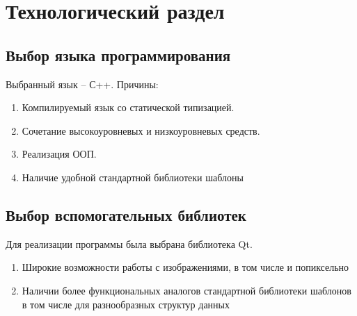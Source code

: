 \chapter{Технологический раздел}
\section{Выбор  языка программирования}
Выбранный язык – С++.
Причины:
\begin{enumerate}
	 \item Компилируемый язык со статической типизацией. 
	 \item Сочетание высокоуровневых и низкоуровневых средств.
	 \item Реализация ООП.
	 \item Наличие удобной стандартной библиотеки шаблоны
	 \end{enumerate}
\section{Выбор вспомогательных библиотек}
Для реализации программы была выбрана библиотека Qt.
\begin{enumerate}
	\item Широкие возможности работы с изображениями, в том числе и попиксельно
	\item Наличии более функциональных аналогов стандартной библиотеки шаблонов в том числе для разнообразных структур данных
\end{enumerate}
